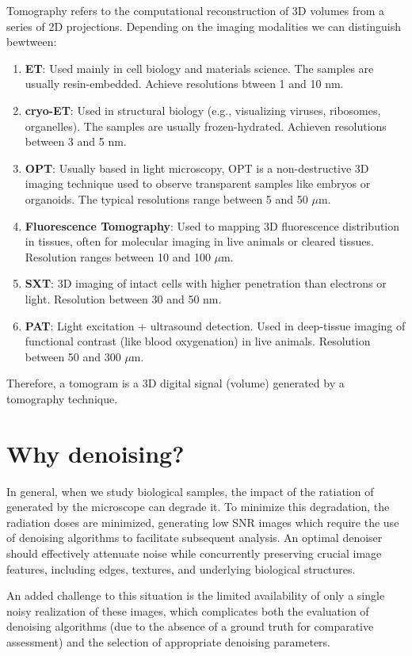 Tomography refers to the computational reconstruction of 3D volumes
from a series of 2D projections. Depending on the imaging modalities
we can distinguish bewtween:
\begin{enumerate}
\item \textbf{\gls{ET}}: Used mainly in cell biology and materials
  science. The samples are usually resin-embedded. Achieve resolutions
  btween 1 and 10 nm.
\item \textbf{\gls{cryo-ET}}: Used in structural
  biology (e.g., visualizing viruses, ribosomes, organelles). The
  samples are usually frozen-hydrated. Achieven resolutions between 3
  and 5 nm.
\item \textbf{\gls{OPT}}: Usually based in
  light microscopy, OPT is a non-destructive 3D imaging technique used
  to observe transparent samples like embryos or organoids. The
  typical resolutions range between 5 and 50 $\mu$m.
\item \textbf{Fluorescence Tomography}: Used to mapping 3D
  fluorescence distribution in tissues, often for molecular imaging in
  live animals or cleared tissues. Resolution ranges between 10 and
  100 $\mu$m.
\item \textbf{\gls{SXT}}: 3D imaging of intact cells with
  higher penetration than electrons or light. Resolution between 30
  and 50 nm.
\item \textbf{\gls{PAT}}: Light excitation + ultrasound
  detection. Used in deep-tissue imaging of functional contrast (like
  blood oxygenation) in live animals. Resolution between 50 and 300
  $\mu$m.
\end{enumerate}

Therefore, a tomogram is a 3D digital signal (volume) generated by a
tomography technique.


\section{Why denoising?}
\label{sec:why_denoising}


In general, when we study biological samples, the impact of the
ratiation of generated by the microscope can degrade it. To minimize
this degradation, the radiation doses are minimized, generating low
\gls{SNR} images which require the use of denoising algorithms to
facilitate subsequent analysis. An optimal denoiser should
effectively attenuate noise while concurrently preserving crucial
image features, including edges, textures, and underlying biological
structures.

An added challenge to this situation is the limited availability of
only a single noisy realization of these images, which complicates
both the evaluation of denoising algorithms (due to the absence of a
ground truth for comparative assessment) and the selection of
appropriate denoising parameters. 


